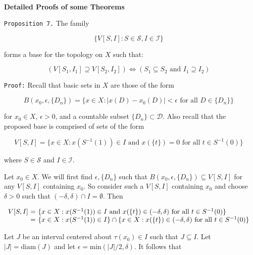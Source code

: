 \documentclass[12pt]{article}
\theoremstyle{plain}
\theoremstyle{definition}
\theoremstyle{remark}
\begin{document}
\newpage \

\newpage

\centerline{\bf Detailed Proofs of some Theorems}

\texttt{Proposition 7.} The family

\[\{V[S,I] : S \in \mathcal{S}, I \in \mathcal{I}\}\]

forms a base for the topology on $X$ such that:

\[(V[S_1,I_1] \supseteq V[S_2,I_2]) \Leftrightarrow (S_1 \subseteq S_2 \text{ and } I_1 \supseteq I_2)\]

\texttt{Proof:}  Recall that basic sets in $X$ are those of the form

\[B(x_0,\epsilon,\{D_n\}) = \{x \in X : |x(D)-x_0(D)|<\epsilon \text{ for all } D\in\{D_n\} \}\]

for $x_0 \in X$, $\epsilon>0$, and a countable subset $\{D_n\} \subset \mathcal{D}$. Also recall that the proposed base is comprised of sets of the form

\[V[S,I] = \{x \in X : x(S^{-1}(1)) \in I \text{ and } x(\{t\})=0 \text{ for all } t \in S^{-1}(0)\}\]

where $S \in \mathcal{S}$ and $I \in \mathcal{I}$.

Let $x_0 \in X$. We will first find $\epsilon,\{D_n\}$ such that $B(x_0,\epsilon,\{D_n\}) \subseteq V[S,I]$ for any $V[S,I]$ containing $x_0$.  So consider such a $V[S,I]$ containing $x_0$ and choose $\delta>0$ such that $(-\delta,\delta) \cap I = \emptyset$. Then

\[
\begin{array}{r@{\ =\ }l}
V[S,I]
&
\{x\in X : x(S^{-1}(1))\in I
\text{ and }
x(\{t\})\in (-\delta,\delta) \text{ for all } t \in S^{-1}(0) \}
\\ &
\{x \in X : x(S^{-1}(1))\in I \}
\cap
\{x \in X: x(\{t\})\in (-\delta,\delta) \text{ for all } t \in S^{-1}(0) \}
\end{array}
\]

Let $J$ be an interval centered about $\tau(x_0)\in I$ such that $J \subseteq I$. Let $|J|=\textrm{diam}(J)$ and let $\epsilon=\textrm{min}(|J|/2,\delta)$.  It follows that
\end{document}
